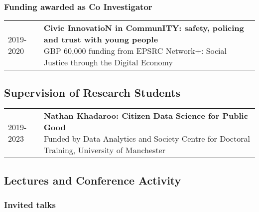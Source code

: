 \documentclass[10pt,a4paper,]{article}
\makeatletter
\def\briefitem#1#2#3{
#2 & \parbox[t]{0.85\textwidth}{%
      \textbf{#1}\\[-0.1cm]{\footnotesize #3}}\\[0.4cm]}
\def\briefsection#1{\begin{longtable}{@{\extracolsep{\fill}}ll}#1\end{longtable}}
\makeatother
\begin{document}
\hypertarget{funding-awarded-as-co-investigator}{%
\subsubsection{Funding awarded as Co Investigator}\label{funding-awarded-as-co-investigator}}

\briefsection{\briefitem{Civic InnovatioN in CommunITY: safety, policing and trust with young people}{2019-2020}{GBP 60,000 funding from EPSRC Network+: Social Justice through the Digital Economy}}

\hypertarget{supervision-of-research-students}{%
\subsection{Supervision of Research Students}\label{supervision-of-research-students}}

\briefsection{\briefitem{Nathan Khadaroo: Citizen Data Science for Public Good}{2019-2023}{Funded by Data Analytics and Society Centre for Doctoral Training, University of Manchester}\briefitem{Mohammed Patel: Health-related behaviour and working conditions}{2019-2023}{Funded by Data Analytics and Society Centre for Doctoral Training, University of Manchester}\briefitem{Sebastian Acevedo: Unequal Distribution of Access to Public Safety: The Case of Local Governments in Chile}{2018-2021}{Funded by Capital Humano Avanzado Conicyt - Becas Chile}\briefitem{Daniel Hammocks: Innovation in Police Intelligence Practice: Horizon Scanning Tools and Processes for Finding Signals within the Noise.}{2018-2022}{Funded by the Dawes Centre for Future Crimes (and based in University College London)}\briefitem{Oskar Enghoff: Consumer culture in an illicit digital economy: the production of demand, risk perceptions and trust among digital consumers of illicit drugs}{2017-2020}{Funded by Engineering and Physical Research Council}}

\hypertarget{lectures-and-conference-activity}{%
\subsection{Lectures and Conference Activity}\label{lectures-and-conference-activity}}

\hypertarget{invited-talks}{%
\subsubsection{Invited talks}\label{invited-talks}}
\end{document}
